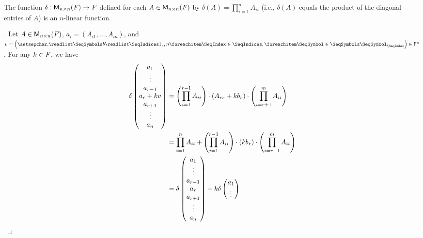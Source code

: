 \begin{eg}\label{4.5.4}
  The function \(\delta : \mathsf{M}_{{n} \times n}({\mathit{F}}) \to \mathit{F}\) defined for each \(A \in \mathsf{M}_{{n} \times n}({\mathit{F}})\) by \(\delta(A) = \prod_{i = 1}^n A_{i i}\) (i.e., \(\delta(A)\) equals the product of the diagonal entries of \(A\)) is an \(n\)-linear function.
\end{eg}

\begin{proof}[]
  Let \(A \in \mathsf{M}_{{n} \times n}({\mathit{F}})\), \(a_i = (A_{i 1}, \dots, A_{i n})\), and \(v = \tuple{b}{1,,n} \in \vs{F}^n\).
  For any \(k \in \mathit{F}\), we have
  \begin{align*}
    \delta\begin{pmatrix}
            a_1       \\
            \vdots    \\
            a_{r - 1} \\
            a_r + kv  \\
            a_{r + 1} \\
            \vdots    \\
            a_n
          \end{pmatrix} & = \left\lparen\prod_{i = 1}^{r - 1} A_{i i}\right\rparen \cdot (A_{r r} + k b_r) \cdot \left\lparen\prod_{i = r + 1}^m A_{i i}\right\rparen                   \\
                          & = \prod_{i = 1}^n A_{i i} + \left\lparen\prod_{i = 1}^{r - 1} A_{i i}\right\rparen \cdot (k b_r) \cdot \left\lparen\prod_{i = r + 1}^m A_{i i}\right\rparen \\
                          & = \delta\begin{pmatrix}
                                      a_1       \\
                                      \vdots    \\
                                      a_{r - 1} \\
                                      a_r       \\
                                      a_{r + 1} \\
                                      \vdots    \\
                                      a_n
                                    \end{pmatrix} + k \delta\begin{pmatrix}
                                                              a_1       \\
                                                              \vdots    \\

\end{pmatrix}
\end{align*}
\end{proof}
